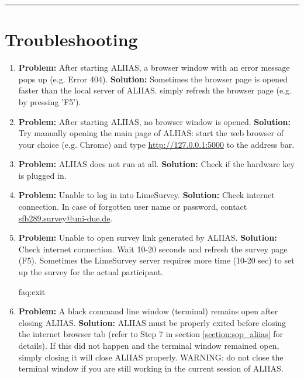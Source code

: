 \par\noindent\rule{\textwidth\color{pniblue}}{0.4pt}
\section{Troubleshooting}
\label{section:faq}

\begin{enumerate}

    \item \label{faq:err404} \textbf{Problem:}
    After starting ALIIAS, a browser window with an error message pops up (e.g. Error 404).
    \newline
    \textbf{Solution:}
    Sometimes the browser page is opened faster than the local server of ALIIAS. simply refresh the browser page (e.g. by pressing 'F5'). 
    
    \item \label{faq:nobrowser} \textbf{Problem:}
    After starting ALIIAS, no browser window is opened.
    \newline
    \textbf{Solution:}
    Try manually opening the main page of ALIIAS: start the web browser of your choice (e.g. Chrome) and type
    \href{http://127.0.0.1:5000}{\color{pniblue}\underline{http://127.0.0.1:5000}} to the address bar.
    
    \item \label{faq:nostart} \textbf{Problem:}
    ALIIAS does not run at all.
    \newline
    \textbf{Solution:}
    Check if the hardware key is plugged in. 
    
    \item \label{faq:ls_login} \textbf{Problem:}
    Unable to log in into LimeSurvey.
    \newline
    \textbf{Solution:}
    Check internet connection. In case of forgotten user name or password, contact \href{mailto:sfb289.survey@uni-due.de}{sfb289.survey@uni-due.de}.
    
    \item \label{faq:survey_link} \textbf{Problem:}
    Unable to open survey link generated by ALIIAS.
    \newline
    \textbf{Solution:}
    Check internet connection. Wait 10-20 seconds and refresh the survey page (F5). Sometimes the LimeSurvey server requires more time (10-20 sec) to set up the survey for the actual participant.
    
    faq:exit
     \item \label{faq:exit} \textbf{Problem:}
    A black command line window (terminal) remains open after closing ALIIAS.
    \newline
    \textbf{Solution:}
    ALIIAS must be properly exited before closing the internet browser tab (refer to Step 7 in section \ref{section:sop_aliias} for details). If this did not happen and the terminal window remained open, simply closing it will close ALIIAS properly. WARNING: do not close the terminal window if you are still working in the current session of ALIIAS.
    
\end{enumerate}

